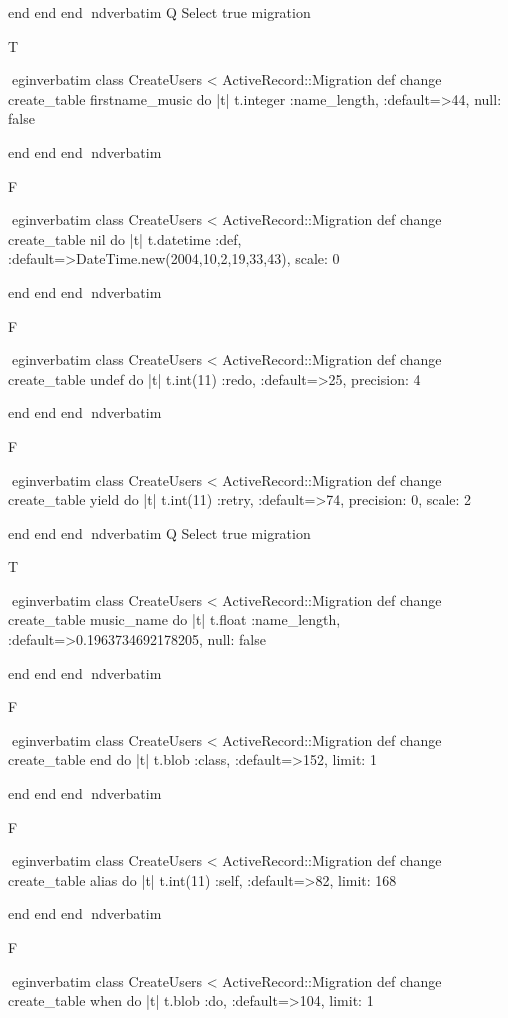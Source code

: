     end 
  end 
end
nd{verbatim}
Q
 Select true migration

T

egin{verbatim}
 class CreateUsers < ActiveRecord::Migration 
  def change 
    create_table firstname_music do |t| 
      t.integer :name_length, :default=>44, null: false
    
    end 
  end 
end
nd{verbatim}

F

egin{verbatim}
 class CreateUsers < ActiveRecord::Migration 
  def change 
    create_table nil do |t| 
      t.datetime :def, :default=>DateTime.new(2004,10,2,19,33,43), scale: 0
    
    end 
  end 
end
nd{verbatim}

F

egin{verbatim}
 class CreateUsers < ActiveRecord::Migration 
  def change 
    create_table undef do |t| 
      t.int(11) :redo, :default=>25, precision: 4
    
    end 
  end 
end
nd{verbatim}

F

egin{verbatim}
 class CreateUsers < ActiveRecord::Migration 
  def change 
    create_table yield do |t| 
      t.int(11) :retry, :default=>74, precision: 0, scale: 2
    
    end 
  end 
end
nd{verbatim}
Q
 Select true migration

T

egin{verbatim}
 class CreateUsers < ActiveRecord::Migration 
  def change 
    create_table music_name do |t| 
      t.float :name_length, :default=>0.1963734692178205, null: false
    
    end 
  end 
end
nd{verbatim}

F

egin{verbatim}
 class CreateUsers < ActiveRecord::Migration 
  def change 
    create_table end do |t| 
      t.blob :class, :default=>152, limit: 1
    
    end 
  end 
end
nd{verbatim}

F

egin{verbatim}
 class CreateUsers < ActiveRecord::Migration 
  def change 
    create_table alias do |t| 
      t.int(11) :self, :default=>82, limit: 168
    
    end 
  end 
end
nd{verbatim}

F

egin{verbatim}
 class CreateUsers < ActiveRecord::Migration 
  def change 
    create_table when do |t| 
      t.blob :do, :default=>104, limit: 1
    
